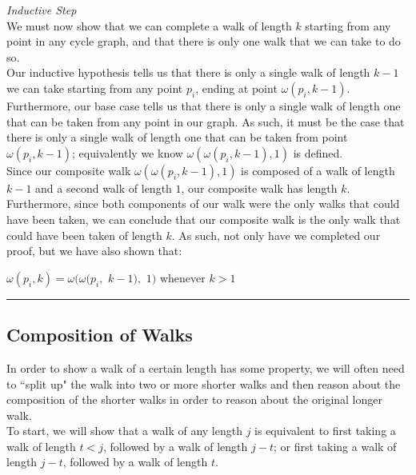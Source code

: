 \documentclass[a4paper,12pt]{article}
\begin{document}
\noindent
\textit{Inductive Step}\\
We must now show that we can complete a walk of length $k$ starting from any point in any cycle graph, and that there is only one walk that we can take to do so.\\

\noindent Our inductive hypothesis tells us that there is only a single walk of length $k - 1$ we can take starting from any point $p_i$, ending at point $\omega(p_i, k - 1)$.\\

\noindent Furthermore, our base case tells us that there is only a single walk of length one that can be taken from any point in our graph. As such, it must be the case that there is only a single walk of length one that can be taken from point $\omega(p_i, k - 1)$; equivalently we know $\omega(\omega(p_i, k - 1), 1)$ is defined.\\

\noindent Since our composite walk $\omega(\omega(p_i, k - 1), 1)$ is composed of a walk of length $k - 1$ and a second walk of length $1$, our composite walk has length $k$. Furthermore, since both components of our walk were the only walks that could have been taken, we can conclude that our composite walk is the only walk that could have been taken of length $k$. As such, not only have we completed our proof, but we have also shown that:

\begin{center}
$\omega(p_i, k) = \omega(\omega(p_i,$ $k - 1),$ $1)$ whenever $k > 1$
\end{center}

\begin{center}
\noindent\rule{8cm}{0.4pt}
\end{center} 




\subsection{Composition of Walks}
\label{sec:composition_of_walks}

In order to show a walk of a certain length has some property, we will often need to ``split up" the walk into two or more shorter walks and then reason about the composition of the shorter walks in order to reason about the original longer walk.\\

\noindent To start, we will show that a walk of any length $j$ is equivalent to first taking a walk of length $t < j$, followed by a walk of length $j - t$; or first taking a walk of length $j - t$, followed by a walk of length $t$.\\
\end{document}
